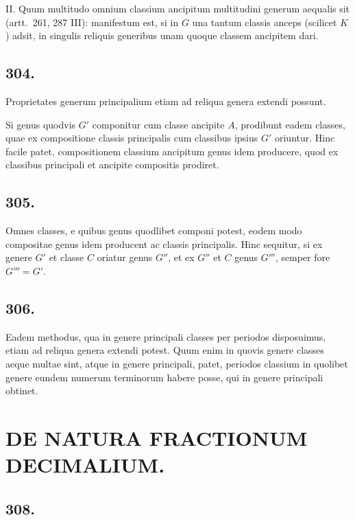 \documentclass[12pt,a4paper]{article}
\theoremstyle{plain}
\theoremstyle{definition}
\theoremstyle{remark}
\begin{document}
\textsc{II.} Quum multitudo omnium classium ancipitum multitudini generum
aequalis sit (artt.\@~261, 287 III): manifestum est, si in $G$ una tantum classis
anceps (scilicet $K$) adsit, in singulis reliquis generibus unam quoque classem
ancipitem dari.

\subsection*{304.}

Proprietates generum principalium etiam ad reliqua genera extendi possunt.

Si genus quodvis $G'$ componitur cum classe ancipite $A$, prodibunt eadem
classes, quae ex compositione classis principalis cum classibus ipsius $G'$ oriuntur.
Hinc facile patet, compositionem classium ancipitum genus idem producere,
quod ex classibus principali et ancipite compositis prodiret.

\subsection*{305.}

Omnes classes, e quibus genus quodlibet componi potest, eodem modo
compositae genus idem producent ac classis principalis. Hinc sequitur, si ex
genere $G'$ et classe $C$ oriatur genus $G''$, et ex $G''$ et $C$ genus $G'''$, semper
fore $G''' = G'$.

\subsection*{306.}

Eadem methodus, qua in genere principali classes per periodos disposuimus,
etiam ad reliqua genera extendi potest. Quum enim in quovis genere classes
aeque multae sint, atque in genere principali, patet, periodos classium in quolibet
genere eundem numerum terminorum habere posse, qui in genere principali
obtinet.

\newpage
{}
\section*{DE NATURA FRACTIONUM DECIMALIUM.}


\subsection*{308.}
\end{document}
